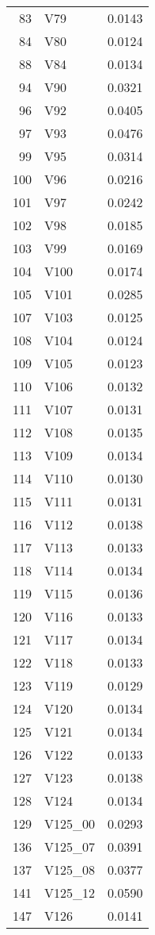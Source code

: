 \documentclass{amsart}
\begin{document}
\begin{longtable}{rlr}
  83 & V79 & 0.0143 \\ 
  84 & V80 & 0.0124 \\ 
  88 & V84 & 0.0134 \\ 
  94 & V90 & 0.0321 \\ 
  96 & V92 & 0.0405 \\ 
  97 & V93 & 0.0476 \\ 
  99 & V95 & 0.0314 \\ 
  100 & V96 & 0.0216 \\ 
  101 & V97 & 0.0242 \\ 
  102 & V98 & 0.0185 \\ 
  103 & V99 & 0.0169 \\ 
  104 & V100 & 0.0174 \\ 
  105 & V101 & 0.0285 \\ 
  107 & V103 & 0.0125 \\ 
  108 & V104 & 0.0124 \\ 
  109 & V105 & 0.0123 \\ 
  110 & V106 & 0.0132 \\ 
  111 & V107 & 0.0131 \\ 
  112 & V108 & 0.0135 \\ 
  113 & V109 & 0.0134 \\ 
  114 & V110 & 0.0130 \\ 
  115 & V111 & 0.0131 \\ 
  116 & V112 & 0.0138 \\ 
  117 & V113 & 0.0133 \\ 
  118 & V114 & 0.0134 \\ 
  119 & V115 & 0.0136 \\ 
  120 & V116 & 0.0133 \\ 
  121 & V117 & 0.0134 \\ 
  122 & V118 & 0.0133 \\ 
  123 & V119 & 0.0129 \\ 
  124 & V120 & 0.0134 \\ 
  125 & V121 & 0.0134 \\ 
  126 & V122 & 0.0133 \\ 
  127 & V123 & 0.0138 \\ 
  128 & V124 & 0.0134 \\ 
  129 & V125\_00 & 0.0293 \\ 
  136 & V125\_07 & 0.0391 \\ 
  137 & V125\_08 & 0.0377 \\ 
  141 & V125\_12 & 0.0590 \\ 
  147 & V126 & 0.0141 \\ 

\end{longtable}
\end{document}

